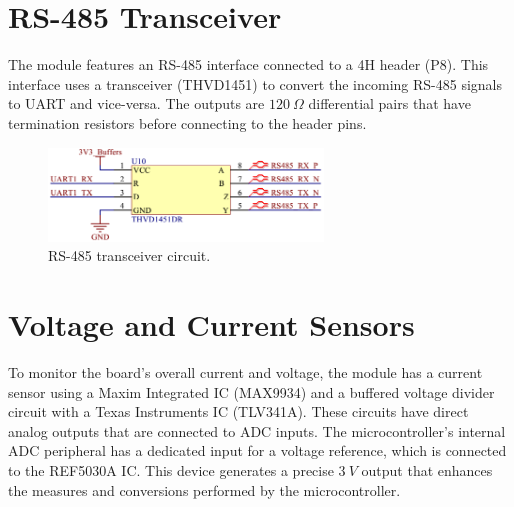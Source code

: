 \section{RS-485 Transceiver}

The module features an RS-485 interface connected to a 4H header (P8). This interface uses a transceiver (THVD1451) to convert the incoming RS-485 signals to UART and vice-versa. The outputs are $120\ \Omega$ differential pairs that have termination resistors before connecting to the header pins.

\begin{figure}[!ht]
    \begin{center}
        \includegraphics[width=0.65\textwidth]{figures/rs485-transceiver-circuit.png}
        \caption{RS-485 transceiver circuit.}
        \label{fig:rs485-transceiver-circuit}
    \end{center}
\end{figure}

\section{Voltage and Current Sensors}

To monitor the board's overall current and voltage, the module has a current sensor using a Maxim Integrated IC (MAX9934) and a buffered voltage divider circuit with a Texas Instruments IC (TLV341A). These circuits have direct analog outputs that are connected to ADC inputs. The microcontroller's internal ADC peripheral has a dedicated input for a voltage reference, which is connected to the REF5030A IC. This device generates a precise $3\ V$ output that enhances the measures and conversions performed by the microcontroller.
